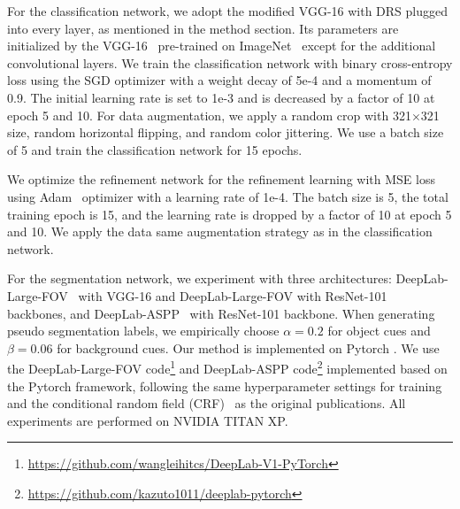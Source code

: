 \documentclass[letterpaper]{article} \usepackage{aaai21}  \usepackage{times}  \usepackage{helvet} \usepackage{courier}  \usepackage[hyphens]{url}  \usepackage{graphicx} \urlstyle{rm} \def\UrlFont{\rm}  \usepackage{natbib}  \usepackage{caption} \frenchspacing  \setlength{\pdfpagewidth}{8.5in}  \setlength{\pdfpageheight}{11in}
\begin{document}
For the classification network, we adopt the modified VGG-16 with DRS plugged into every layer, as mentioned in the method section.
Its parameters are initialized by the VGG-16~\cite{simonyan2014very} pre-trained on ImageNet~\cite{deng2009imagenet} except for the additional convolutional layers.
We train the classification network with binary cross-entropy loss using the SGD optimizer with a weight decay of 5e-4 and a momentum of 0.9. 
The initial learning rate is set to 1e-3 and is decreased by a factor of 10 at epoch 5 and 10. 
For data augmentation, we apply a random crop with 321$\times$321 size, random horizontal flipping, and random color jittering.
We use a batch size of 5 and train the classification network for 15 epochs.

We optimize the refinement network for the refinement learning with MSE loss using Adam~\cite{kingma2014adam} optimizer with a learning rate of 1e-4. The batch size is 5, the total training epoch is 15, and the learning rate is dropped by a factor of 10 at epoch 5 and 10.
We apply the data same augmentation strategy as in the classification network.

For the segmentation network, we experiment with three architectures: DeepLab-Large-FOV~\cite{chen2014semantic} with VGG-16 and DeepLab-Large-FOV with ResNet-101~\cite{he2016deep} backbones, and DeepLab-ASPP~\cite{chen2017deeplab} with ResNet-101 backbone.
When generating pseudo segmentation labels, we empirically choose $\alpha = 0.2$ for object cues and $\beta = 0.06$ for background cues.
Our method is implemented on Pytorch \cite{paszke2017automatic}.
We use the DeepLab-Large-FOV code\footnote{\url{https://github.com/wangleihitcs/DeepLab-V1-PyTorch}} and DeepLab-ASPP code\footnote{\url{https://github.com/kazuto1011/deeplab-pytorch}} implemented based on the Pytorch framework, following the same hyperparameter settings for training and the conditional random field (CRF)~\cite{krahenbuhl2011efficient} as the original publications.
All experiments are performed on NVIDIA TITAN XP.
\end{document}
